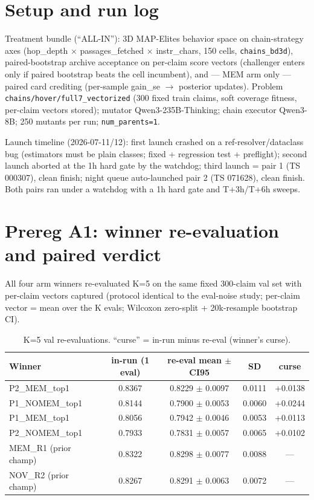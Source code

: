 \documentclass[10pt]{article}
\begin{document}
\section*{Setup and run log}
Treatment bundle (``ALL-IN''): 3D MAP-Elites behavior space on chain-strategy axes
(hop\_depth $\times$ passages\_fetched $\times$ instr\_chars, 150 cells,
\texttt{chains\_bd3d}), paired-bootstrap archive acceptance on per-claim score
vectors (challenger enters only if paired bootstrap beats the cell incumbent), and
--- MEM arm only --- paired card crediting (per-sample gain\_se $\to$ posterior
updates). Problem \texttt{chains/hover/full7\_vectorized} (300 fixed train
claims, soft coverage fitness, per-claim vectors stored); mutator
Qwen3-235B-Thinking; chain executor Qwen3-8B; 250 mutants per run;
\texttt{num\_parents=1}.

Launch timeline (2026-07-11/12): first launch crashed on a ref-resolver/dataclass
bug (estimators must be plain classes; fixed + regression test + preflight);
second launch aborted at the 1h hard gate by the watchdog; third launch = pair 1
(TS 000307), clean finish; night queue auto-launched pair 2 (TS 071628), clean
finish. Both pairs ran under a watchdog with a 1h hard gate and T+3h/T+6h sweeps.

\section*{Prereg A1: winner re-evaluation and paired verdict}
All four arm winners re-evaluated K=5 on the same fixed 300-claim val set with
per-claim vectors captured (protocol identical to the eval-noise study; per-claim
vector = mean over the K evals; Wilcoxon zero-split + 20k-resample bootstrap CI).

\begin{table}[H]\centering
\begin{tabular}{lcccc}
\toprule
Winner & in-run (1 eval) & re-eval mean $\pm$ CI95 & SD & curse \\
\midrule
P2\_MEM\_top1 & 0.8367 & 0.8229 $\pm$ 0.0097 & 0.0111 & +0.0138 \\
P1\_NOMEM\_top1 & 0.8144 & 0.7900 $\pm$ 0.0053 & 0.0060 & +0.0244 \\
P1\_MEM\_top1 & 0.8056 & 0.7942 $\pm$ 0.0046 & 0.0053 & +0.0113 \\
P2\_NOMEM\_top1 & 0.7933 & 0.7831 $\pm$ 0.0057 & 0.0065 & +0.0102 \\
\midrule
MEM\_R1 (prior champ) & 0.8322 & 0.8298 $\pm$ 0.0077 & 0.0088 & --- \\
NOV\_R2 (prior champ) & 0.8267 & 0.8291 $\pm$ 0.0063 & 0.0072 & --- \\
\bottomrule
\end{tabular}
\caption{K=5 val re-evaluations. ``curse'' = in-run minus re-eval (winner's curse).}
\end{table}
\end{document}
